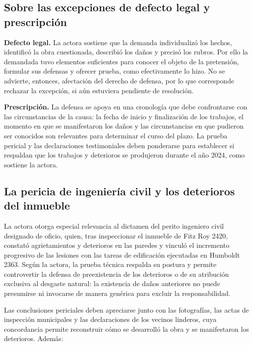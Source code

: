 \documentclass[12pt,oneside]{book}
\begin{document}
\subsection{Sobre las excepciones de defecto legal y prescripci\'on}

\textbf{Defecto legal.} La actora sostiene que la demanda individualiz\'o los hechos, identific\'o la obra cuestionada, describi\'o los da\~nos y precis\'o los rubros. Por ello la demandada tuvo elementos suficientes para conocer el objeto de la pretensi\'on, formular sus defensas y ofrecer prueba, como efectivamente lo hizo. No se advierte, entonces, afectaci\'on del derecho de defensa, por lo que corresponde rechazar la excepci\'on, si a\'un estuviera pendiente de resoluci\'on.

\textbf{Prescripci\'on.} La defensa se apoya en una cronolog\'ia que debe confrontarse con las circunstancias de la causa: la fecha de inicio y finalizaci\'on de los trabajos, el momento en que se manifestaron los da\~nos y las circunstancias en que pudieron ser conocidos son relevantes para determinar el curso del plazo. La prueba pericial y las declaraciones testimoniales deben ponderarse para establecer si respaldan que los trabajos y deterioros se produjeron durante el a\~no 2024, como sostiene la actora.

\subsection{La pericia de ingenier\'ia civil y los deterioros del inmueble}

La actora otorga especial relevancia al dictamen del perito ingeniero civil designado de oficio, quien, tras inspeccionar el inmueble de Fitz Roy 2420, constat\'o agrietamientos y deterioros en las paredes y vincul\'o el incremento progresivo de las lesiones con las tareas de edificaci\'on ejecutadas en Humboldt 2363. Seg\'un la actora, la prueba t\'ecnica respalda su postura y permite controvertir la defensa de preexistencia de los deterioros o de su atribuci\'on exclusiva al desgaste natural: la existencia de da\~nos anteriores no puede presumirse ni invocarse de manera gen\'erica para excluir la responsabilidad.

Las conclusiones periciales deben apreciarse junto con las fotograf\'ias, las actas de inspecci\'on municipales y las declaraciones de los vecinos linderos, cuya concordancia permite reconstruir c\'omo se desarroll\'o la obra y se manifestaron los deterioros. Adem\'as:
\end{document}
